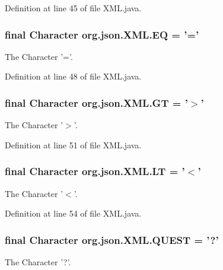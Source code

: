 Definition at line 45 of file X\-M\-L.\-java.

\hypertarget{classorg_1_1json_1_1XML_a79c30d409011e7c5bbffe3a9dd487b19}{
\subsubsection[{E\-Q}]{\setlength{\rightskip}{0pt plus 5cm}final Character org.\-json.\-X\-M\-L.\-E\-Q = '='\hspace{0.3cm}{\ttfamily [static]}}}\label{classorg_1_1json_1_1XML_a79c30d409011e7c5bbffe3a9dd487b19}
The Character '='. 

Definition at line 48 of file X\-M\-L.\-java.

\hypertarget{classorg_1_1json_1_1XML_a0a9f1aaef15f78d43c532e601546a722}{
\subsubsection[{G\-T}]{\setlength{\rightskip}{0pt plus 5cm}final Character org.\-json.\-X\-M\-L.\-G\-T = '$>$'\hspace{0.3cm}{\ttfamily [static]}}}\label{classorg_1_1json_1_1XML_a0a9f1aaef15f78d43c532e601546a722}
The Character '$>$'. 

Definition at line 51 of file X\-M\-L.\-java.

\hypertarget{classorg_1_1json_1_1XML_a12c351d05c7c78c4730d1ec44ae6b798}{
\subsubsection[{L\-T}]{\setlength{\rightskip}{0pt plus 5cm}final Character org.\-json.\-X\-M\-L.\-L\-T = '$<$'\hspace{0.3cm}{\ttfamily [static]}}}\label{classorg_1_1json_1_1XML_a12c351d05c7c78c4730d1ec44ae6b798}
The Character '$<$'. 

Definition at line 54 of file X\-M\-L.\-java.

\hypertarget{classorg_1_1json_1_1XML_a6ee91c7c64c44b62b197a69b00ee383f}{
\subsubsection[{Q\-U\-E\-S\-T}]{\setlength{\rightskip}{0pt plus 5cm}final Character org.\-json.\-X\-M\-L.\-Q\-U\-E\-S\-T = '?'\hspace{0.3cm}{\ttfamily [static]}}}\label{classorg_1_1json_1_1XML_a6ee91c7c64c44b62b197a69b00ee383f}
The Character '?'. 


